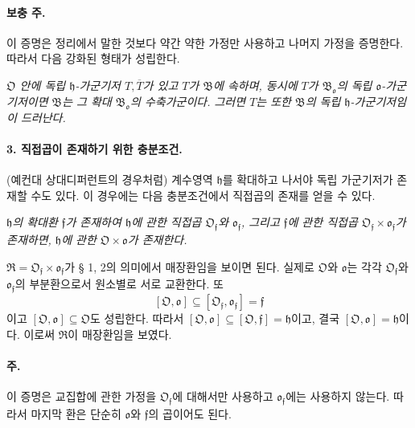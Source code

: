 \paragraph{보충 주.}
이 증명은 정리에서 말한 것보다 약간 약한 가정만 사용하고 나머지 가정을 증명한다. 따라서 다음 강화된 형태가 성립한다.

\emph{\(\mathfrak O\) 안에 독립 \(\mathfrak h\)-가군기저 \(T,\overline T\)가 있고 \(T\)가 \(\mathfrak B\)에 속하며, 동시에 \(T\)가 \(\mathfrak B_{\mathfrak o}\)의 독립 \(\mathfrak o\)-가군기저이면 \(\mathfrak B\)는 그 확대 \(\mathfrak B_{\mathfrak o}\)의 수축가군이다. 그러면 \(T\)는 또한 \(\mathfrak B\)의 독립 \(\mathfrak h\)-가군기저임이 드러난다.}

\paragraph{3. 직접곱이 존재하기 위한 충분조건.}
(예컨대 상대디퍼런트의 경우처럼) 계수영역 \(\mathfrak h\)를 확대하고 나서야 독립 가군기저가 존재할 수도 있다. 이 경우에는 다음 충분조건에서 직접곱의 존재를 얻을 수 있다.

\emph{\(\mathfrak h\)의 확대환 \(\mathfrak f\)가 존재하여 \(\mathfrak h\)에 관한 직접곱 \(\mathfrak O_{\mathfrak f}\)와 \(\mathfrak o_{\mathfrak f}\), 그리고 \(\mathfrak f\)에 관한 직접곱 \(\mathfrak O_{\mathfrak f}\times\mathfrak o_{\mathfrak f}\)가 존재하면, \(\mathfrak h\)에 관한 \(\mathfrak O\times\mathfrak o\)가 존재한다.}

\(\mathfrak R=\mathfrak O_{\mathfrak f}\times\mathfrak o_{\mathfrak f}\)가 § 1, 2의 의미에서 매장환임을 보이면 된다. 실제로 \(\mathfrak O\)와 \(\mathfrak o\)는 각각 \(\mathfrak O_{\mathfrak f}\)와 \(\mathfrak o_{\mathfrak f}\)의 부분환으로서 원소별로 서로 교환한다. 또
\[
[\mathfrak O,\mathfrak o]\subseteq[\mathfrak O_{\mathfrak f},\mathfrak o_{\mathfrak f}]=\mathfrak f
\]
이고 \([\mathfrak O,\mathfrak o]\subseteq\mathfrak O\)도 성립한다. 따라서 \([\mathfrak O,\mathfrak o]\subseteq[\mathfrak O,\mathfrak f]=\mathfrak h\)이고, 결국 \([\mathfrak O,\mathfrak o]=\mathfrak h\)이다. 이로써 \(\mathfrak R\)이 매장환임을 보였다.

\paragraph{주.}
이 증명은 교집합에 관한 가정을 \(\mathfrak O_{\mathfrak f}\)에 대해서만 사용하고 \(\mathfrak o_{\mathfrak f}\)에는 사용하지 않는다. 따라서 마지막 환은 단순히 \(\mathfrak o\)와 \(\mathfrak f\)의 곱이어도 된다.

